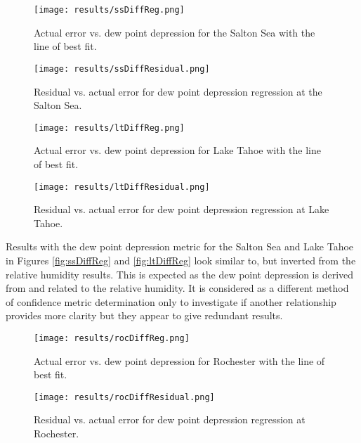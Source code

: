 \documentclass{book}
\begin{document}
\begin{figure}[H]
\begin{minipage}[b]{0.47\textwidth}
\centering
\texttt{[image: results/ssDiffReg.png]}
\caption{Actual error vs. dew point depression for the Salton Sea with the line of best fit.}
\label{fig:ssDiffReg}
\end{minipage}
\begin{minipage}[b]{0.47\textwidth}
\centering
\texttt{[image: results/ssDiffResidual.png]}
\caption{Residual vs. actual error for dew point depression regression at the \\ Salton Sea.}
\label{fig:ssDiffResidual}
\end{minipage}
\end{figure}

\begin{figure}[H]
\begin{minipage}[b]{0.47\textwidth}
\centering
\texttt{[image: results/ltDiffReg.png]}
\caption{Actual error vs. dew point depression for Lake Tahoe with the line of best fit.}
\label{fig:ltDiffReg}
\end{minipage}
\begin{minipage}[b]{0.47\textwidth}
\centering
\texttt{[image: results/ltDiffResidual.png]}
\caption{Residual vs. actual error for dew point depression regression at Lake Tahoe.}
\label{fig:ltDiffResidual}
\end{minipage}
\end{figure}

Results with the dew point depression metric for the Salton Sea and Lake Tahoe in Figures \ref{fig:ssDiffReg} and \ref{fig:ltDiffReg} look similar to, but inverted from the relative humidity results.  This is expected as the dew point depression is derived from and related to the relative humidity.  It is considered as a different method of confidence metric determination only to investigate if another relationship provides more clarity but they appear to give redundant results.

\begin{figure}[H]
\begin{minipage}[b]{0.47\textwidth}
\centering
\texttt{[image: results/rocDiffReg.png]}
\caption{Actual error vs. dew point depression for Rochester with the line of best fit.}
\label{fig:rocDiffReg}
\end{minipage}
\begin{minipage}[b]{0.47\textwidth}
\centering
\texttt{[image: results/rocDiffResidual.png]}
\caption{Residual vs. actual error for dew point depression regression at Rochester.}
\label{fig:rocDiffResidual}
\end{minipage}
\end{figure}
\end{document}
